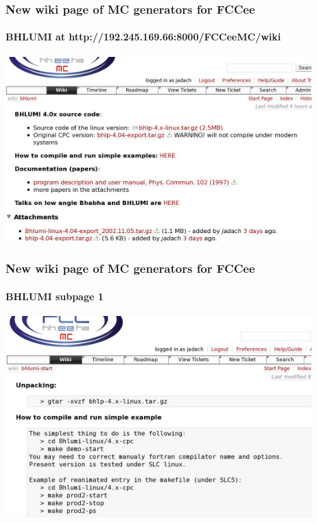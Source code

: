 \documentclass{beamer}
\begin{document}
\begin{frame}[fragile]
\frametitle{\bf New wiki page of MC generators for FCCee}
\framesubtitle{\bf BHLUMI at http://192.245.169.66:8000/FCCeeMC/wiki}

\includegraphics[width=118mm]{./wiki1.jpg}

\end{frame}


\begin{frame}[fragile]
\frametitle{\bf New wiki page of MC generators for FCCee}
\framesubtitle{\bf BHLUMI subpage 1 }

\includegraphics[width=118mm]{./wiki2.jpg}

\end{frame}
\end{document}
